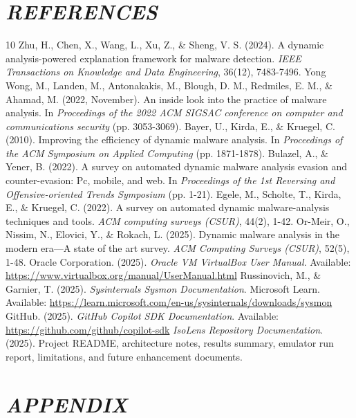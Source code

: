 \documentclass[a4paper,12pt,oneside]{report}
\begin{document}
\chapter*{\textit{REFERENCES}}
\begin{thebibliography}{10}
 Zhu, H., Chen, X., Wang, L., Xu, Z., \& Sheng, V. S. (2024). A dynamic analysis-powered explanation framework for malware detection. \textit{IEEE Transactions on Knowledge and Data Engineering}, 36(12), 7483-7496.
 Yong Wong, M., Landen, M., Antonakakis, M., Blough, D. M., Redmiles, E. M., \& Ahamad, M. (2022, November). An inside look into the practice of malware analysis. In \textit{Proceedings of the 2022 ACM SIGSAC conference on computer and communications security} (pp. 3053-3069).
 Bayer, U., Kirda, E., \& Kruegel, C. (2010). Improving the efficiency of dynamic malware analysis. In \textit{Proceedings of the ACM Symposium on Applied Computing} (pp. 1871-1878).
 Bulazel, A., \& Yener, B. (2022). A survey on automated dynamic malware analysis evasion and counter-evasion: Pc, mobile, and web. In \textit{Proceedings of the 1st Reversing and Offensive-oriented Trends Symposium} (pp. 1-21).
 Egele, M., Scholte, T., Kirda, E., \& Kruegel, C. (2022). A survey on automated dynamic malware-analysis techniques and tools. \textit{ACM computing surveys (CSUR)}, 44(2), 1-42.
 Or-Meir, O., Nissim, N., Elovici, Y., \& Rokach, L. (2025). Dynamic malware analysis in the modern era---A state of the art survey. \textit{ACM Computing Surveys (CSUR)}, 52(5), 1-48.
 Oracle Corporation. (2025). \textit{Oracle VM VirtualBox User Manual}. Available: \url{https://www.virtualbox.org/manual/UserManual.html}
 Russinovich, M., \& Garnier, T. (2025). \textit{Sysinternals Sysmon Documentation}. Microsoft Learn. Available: \url{https://learn.microsoft.com/en-us/sysinternals/downloads/sysmon}
 GitHub. (2025). \textit{GitHub Copilot SDK Documentation}. Available: \url{https://github.com/github/copilot-sdk}
 \textit{IsoLens Repository Documentation}. (2025). Project README, architecture notes, results summary, emulator run report, limitations, and future enhancement documents.
\end{thebibliography}

\chapter*{\textit{APPENDIX}}
\setcounter{figure}{0}
\renewcommand{\thefigure}{A.\arabic{figure}}
\end{document}
